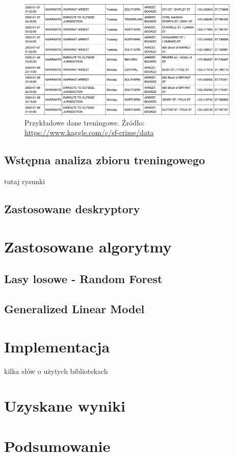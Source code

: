\documentclass[11pt]{article} %
\begin{document}
\begin{figure}[!h]
  \centering
    \includegraphics[width=0.95\textwidth]{images/train_data.png}
  \caption{Przykładowe dane treningowe. Źródło: \protect\url{https://www.kaggle.com/c/sf-crime/data} }
\end{figure}



\subsection{Wstępna analiza zbioru treningowego}
 tutaj rysunki

\subsection{Zastosowane deskryptory}


\section{Zastosowane algorytmy}
\subsection{Lasy losowe - Random Forest}

\subsection{Generalized Linear Model}


\section{Implementacja}

kilka słów o użytych bibliotekach

\section{Uzyskane wyniki}




\section{Podsumowanie}
\end{document}
